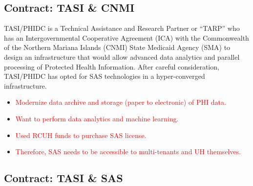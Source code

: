 \subsection{Contract: TASI \& CNMI}
TASI/PHIDC is a Technical Assistance and Research Partner or “TARP” who has an Intergovernmental Cooperative Agreement (ICA) with the Commonwealth of the Northern Mariana Islands (CNMI) State Medicaid Agency (SMA) to design an infrastructure that would allow advanced data analytics and parallel processing of Protected Health Information. After careful consideration, TASI/PHIDC has opted for SAS technologies in a hyper-converged infrastructure.

\begin{itemize}
    \item \textcolor{red}{Modernize data archive and storage (paper to electronic) of PHI data.}
    \item \textcolor{red}{Want to perform data analytics and machine learning.}
    \item \textcolor{red}{Used RCUH funds to purchase SAS license.}
    \item \textcolor{red}{Therefore, SAS needs to be accessible to multi-tenants and UH themselves.}
\end{itemize}

\subsection{Contract: TASI \& SAS }

